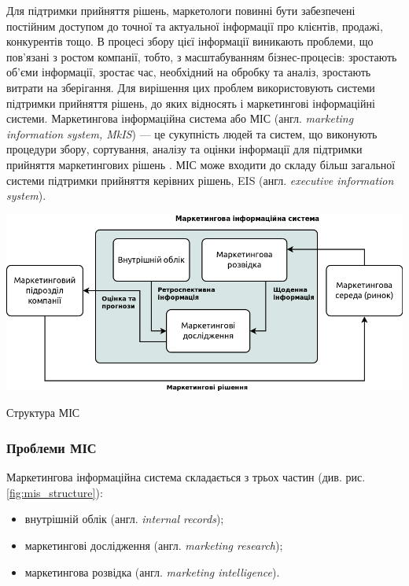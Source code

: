 Для підтримки прийняття рішень, маркетологи повинні бути забезпечені постійним доступом до точної та актуальної інформації про клієнтів, продажі, конкурентів тощо. В процесі збору цієї інформації виникають проблеми, що пов’язані з ростом компанії, тобто, з масштабуванням бізнес-процесів: зростають об’єми інформації, зростає час, необхідний на обробку та аналіз, зростають витрати на зберігання. Для вирішення цих проблем використовують системи підтримки прийняття рішень, до яких відносять і маркетингові інформаційні системи. Маркетингова інформаційна система або МІС (англ. {\it marketing information system, MkIS}) --- це сукупність людей та систем, що виконують процедури збору, сортування, аналізу та оцінки інформації для підтримки прийняття маркетингових рішень \cite{kotler14}. МІС може входити до складу більш загальної системи підтримки прийняття керівних рішень, EIS (англ. {\it executive information system}).

\begin{stdfigure}
\includegraphics[width=7in]{images/mis_structure.png}
\caption{Структура МІС}
\label{fig:mis_structure}
\end{stdfigure}    

\subsubsection{Проблеми МІС}
Маркетингова інформаційна система складається з трьох частин (див. рис. \ref{fig:mis_structure})\cite{kotler14}: 
\begin{itemize}
\item внутрішній облік (англ. {\it internal records});
\item маркетингові дослідження (англ. {\it marketing research});
\item маркетингова розвідка (англ. {\it marketing intelligence}).
\end{itemize}

